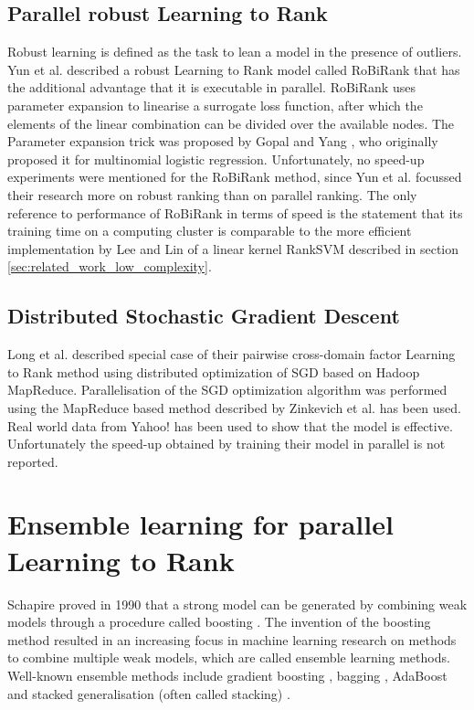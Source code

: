 \subsection{Parallel robust Learning to Rank}
Robust learning \cite{Huber1981} is defined as the task to lean a model in the presence of outliers. Yun et al. described a \cite{Yun2014} robust Learning to Rank model called RoBiRank that has the additional advantage that it is executable in parallel. RoBiRank uses parameter expansion to linearise a surrogate loss function, after which the elements of the linear combination can be divided over the available nodes. The Parameter expansion trick was proposed by Gopal and Yang \cite{Gopal2013}, who originally proposed it for multinomial logistic regression. Unfortunately, no speed-up experiments were mentioned for the RoBiRank method, since Yun et al. focussed their research more on robust ranking than on parallel ranking. The only reference to performance of RoBiRank in terms of speed is the statement that its training time on a computing cluster is comparable to the more efficient implementation by Lee and Lin \cite{Lee2014} of a linear kernel Rank\ac{SVM} \cite{Herbrich1999, Joachims2002} described in section \ref{sec:related_work_low_complexity}.
\subsection{Distributed Stochastic Gradient Descent}
Long et al. \cite{Long2012} described special case of their pairwise cross-domain factor Learning to Rank method using distributed optimization of \ac{SGD} based on Hadoop MapReduce. Parallelisation of the \ac{SGD} optimization algorithm was performed using the MapReduce based method described by  Zinkevich et al. \cite{Zinkevich2010} has been used. Real world data from Yahoo! has been used to show that the model is effective. Unfortunately the speed-up obtained by training their model in parallel is not reported.\\

\section{Ensemble learning for parallel Learning to Rank}
Schapire proved in 1990 that a strong model can be generated by combining weak models through a procedure called boosting \cite{Schapire1990}. The invention of the boosting method resulted in an increasing focus in machine learning research on methods to combine multiple weak models, which are called ensemble learning methods. Well-known ensemble methods include gradient boosting \cite{Friedman2001}, bagging \cite{Breiman1996}, AdaBoost \cite{Freund1997} and stacked generalisation (often called stacking) \cite{Wolpert1992}.\\

